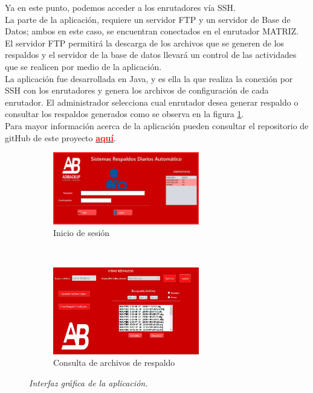 \documentclass[conference]{IEEEtran}
\begin{document}
Ya en este punto, podemos acceder a los enrutadores vía SSH.\\
La parte de la aplicación, requiere un servidor FTP y un servidor de Base de Datos; ambos en este caso, se encuentran conectados en el enrutador MATRIZ. El servidor FTP permitirá la descarga de los archivos que se generen de los respaldos y el servidor de la base de datos llevará un control de las actividades que se realicen por medio de la aplicación.\\
La aplicación fue desarrollada en Java, y es ella la que realiza la conexión por SSH con los enrutadores y genera los archivos de configuración de cada enrutador. El administrador selecciona cual enrutador desea generar respaldo o consultar los respaldos generados como se observa en la figura \ref{fig:ap01}.\\
Para mayor información acerca de la aplicación pueden consultar el repositorio de gitHub de este proyecto \href{https://github.com/jcbodero/2T2018_PROYECTO_SistemaDeRespaldosDiariosAutomaticos_GRUPO1}{\textcolor{red}{\textbf{aquí}}}.
\begin{figure}[h]
    \begin{subfigure}[h]{0.5\textwidth}
       \centerline{\includegraphics[width=0.7\textwidth]{img/ap01.jpg}}
        \caption{Inicio de sesión}
        
    \end{subfigure}
    ~ %
     \begin{subfigure}[h]{0.5\textwidth}
        \centerline{\includegraphics[width=0.7\textwidth]{img/ap02.jpg}}
        \caption{Consulta de archivos de respaldo}
        
    \end{subfigure}
    \caption{\textit{Interfaz gráfica de la aplicación.}}
\label{fig:ap01}
\end{figure}
\end{document}
